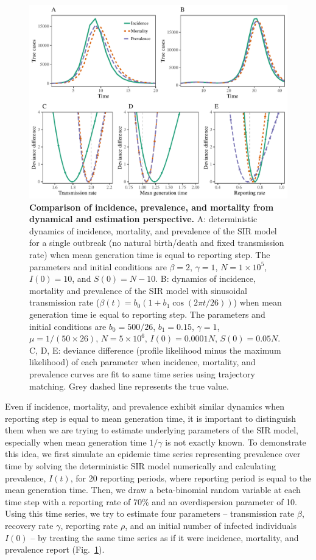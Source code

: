 \documentclass{article}
\newcommand{\fref}[1]{Fig.~\ref{fig:#1}}
\begin{document}
\begin{figure}[!ht]
\includegraphics[width=\textwidth]{../figure/compare_profile_likelihood.pdf}
\caption{
\textbf{Comparison of incidence, prevalence, and mortality from dynamical and estimation perspective.}
A: deterministic dynamics of incidence, mortality, and prevalence of the SIR model for a single outbreak (no natural birth/death and fixed transmission rate) when mean generation time is equal to reporting step.
The parameters and initial conditions are $\beta = 2$, $\gamma = 1$, $N = 1 \times 10^5$, $I(0) = 10$, and $S(0) = N - 10$.
B: dynamics of incidence, mortality and prevalence of the SIR model with sinusoidal transmission rate ($\beta(t) = b_0 (1 + b_1 \cos (2 \pi t/26))$) when mean generation time ie equal to reporting step.
The parameters and initial conditions are $b_0 = 500/26$, $b_1 = 0.15$, $\gamma = 1$, $\mu = 1/(50 \times 26)$, $N = 5 \times 10^6$, $I(0) = 0.0001 N$, $S(0) = 0.05 N$.
C, D, E: deviance difference (profile likelihood minus the maximum likelihood) of each parameter when incidence, mortality, and prevalence curves are fit to same time series using trajectory matching. 
Grey dashed line represents the true value.
} 
\label{fig:incidence}
\end{figure}

Even if incidence, mortality, and prevalence exhibit similar dynamics when reporting step is equal to mean generation time, it is important to distinguish them when we are trying to estimate underlying parameters of the SIR model, especially when mean generation time $1/\gamma$ is not exactly known.
To demonstrate this idea, we first simulate an epidemic time series representing prevalence over time by solving the deterministic SIR model numerically and calculating prevalence, $I(t)$, for 20 reporting periods, where reporting period is equal to the mean generation time. Then, we draw a beta-binomial random variable at each time step with a reporting rate of 70\% and an overdispersion parameter of 10.
Using this time series, we try to estimate four parameters -- transmission rate $\beta$, recovery rate $\gamma$, reporting rate $\rho$, and an initial number of infected individuals $I(0)$ -- by treating the same time series as if it were incidence, mortality, and prevalence report (\fref{incidence}).
\end{document}
